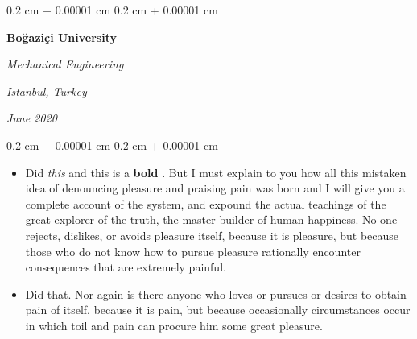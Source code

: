 \documentclass[10pt, letterpaper]{article}
\newenvironment{highlights}{
    \begin{itemize}[
        topsep=0.10 cm,
        parsep=0.10 cm,
        partopsep=0pt,
        itemsep=0pt,
        leftmargin=0.4 cm + 10pt
    ]
}{
    \end{itemize}
} %
\newenvironment{onecolentry}{
    \begin{adjustwidth}{
        0.2 cm + 0.00001 cm
    }{
        0.2 cm + 0.00001 cm
    }
}{
    \end{adjustwidth}
} %
\newenvironment{twocolentry}[2][]{
    \onecolentry
    \def\secondColumn{#2}
    \setcolumnwidth{\fill, 4.5 cm}
    \begin{paracol}{2}
}{
    \switchcolumn \raggedleft \secondColumn
    \end{paracol}
    \endonecolentry
} %
\let\hrefWithoutArrow\href
\renewcommand{\href}[2]{\hrefWithoutArrow{#1}{\ifthenelse{\equal{#2}{}}{ }{#2 }\raisebox{.15ex}{\footnotesize \faExternalLink*}}}
\begin{document}
        \begin{twocolentry}{
        \textit{Istanbul, Turkey}    
            
        \textit{June 2020}}
            \textbf{Boğaziçi University}

            \textit{Mechanical Engineering}
        \end{twocolentry}
        \vspace{0.10 cm}
        \begin{onecolentry}
            \begin{highlights}
                \item Did \textit{this} and this is a \textbf{bold} \href{https://example.com}{link}. But I must explain to you how all this mistaken idea of denouncing pleasure and praising pain was born and I will give you a complete account of the system, and expound the actual teachings of the great explorer of the truth, the master-builder of human happiness. No one rejects, dislikes, or avoids pleasure itself, because it is pleasure, but because those who do not know how to pursue pleasure rationally encounter consequences that are extremely painful.
                \item Did that. Nor again is there anyone who loves or pursues or desires to obtain pain of itself, because it is pain, but because occasionally circumstances occur in which toil and pain can procure him some great pleasure.
            \end{highlights}
        \end{onecolentry}


        \vspace{0.2 cm}
\end{document}
